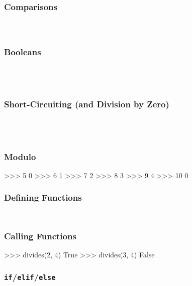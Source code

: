 \documentclass{beamer}
\begin{document}
\begin{frame}[fragile]
  \frametitle{Comparisons}
  \inputminted[firstline=1,lastline=4]{pycon}{code/comparisons.txt}
  \codepause
  \inputminted[firstline=5,lastline=6]{pycon}{code/comparisons.txt}
  \codepause
  \inputminted[firstline=7,lastline=10]{pycon}{code/comparisons.txt}
\end{frame}

\begin{frame}[fragile]
  \frametitle{Booleans}
  \inputminted[firstline=1,lastline=2]{pycon}{code/booleans.txt}
  \codepause
  \inputminted[firstline=3,lastline=4]{pycon}{code/booleans.txt}
  \codepause
  \inputminted[firstline=5,lastline=6]{pycon}{code/booleans.txt}
  \codepause
  \inputminted[firstline=7,lastline=8]{pycon}{code/booleans.txt}
\end{frame}

\begin{frame}[fragile]
  \frametitle{Short-Circuiting (and Division by Zero)}
  \inputminted[firstline=1,lastline=2]{pycon}{code/short_circuit.txt}
  \codepause
  \inputminted[firstline=3,lastline=6]{pycon}{code/short_circuit.txt}
  \codepause
  \inputminted[firstline=7,lastline=8]{pycon}{code/short_circuit.txt}
  \codepause
  \inputminted[firstline=9,lastline=12]{pycon}{code/short_circuit.txt}
\end{frame}

\begin{frame}[fragile]
  \frametitle{Modulo}
\begin{pyconcode}
>>> 5 %
0
>>> 6 %
1
>>> 7 %
2
>>> 8 %
3
>>> 9 %
4
>>> 10 %
0
\end{pyconcode}
\end{frame}

\begin{frame}[fragile]
  \frametitle{Defining Functions}
  \inputminted[firstline=1,lastline=1]{python}{code/divides.txt}
  \codepause
  \inputminted[firstline=2,lastline=2]{python}{code/divides.txt}
\end{frame}

\begin{frame}[fragile]
  \frametitle{Calling Functions}
\begin{pyconcode}
>>> divides(2, 4)
True
>>> divides(3, 4)
False
\end{pyconcode}
\end{frame}

\begin{frame}[fragile]
  \frametitle{\texttt{if}/\texttt{elif}/\texttt{else}}
  \inputminted[firstline=1,lastline=1]{python}{code/sgn.txt}
  \codepause
  \inputminted[firstline=2,lastline=3]{python}{code/sgn.txt}
  \codepause
  \inputminted[firstline=4,lastline=5]{python}{code/sgn.txt}
  \codepause
  \inputminted[firstline=6,lastline=7]{python}{code/sgn.txt}
\end{frame}
\end{document}
